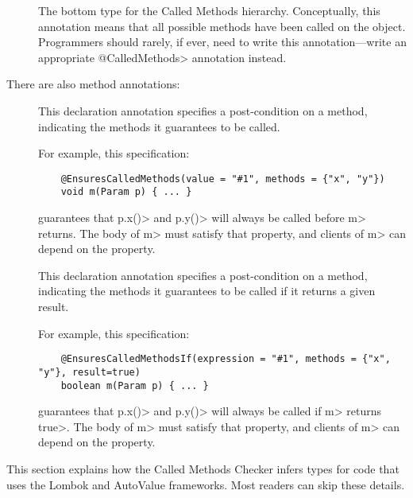 \begin{description}
\item[]
  The bottom type for the Called Methods hierarchy. Conceptually, this annotation
  means that all possible methods have been called on the object. Programmers should rarely,
  if ever, need to write this annotation---write an appropriate \<@CalledMethods> annotation
  instead.

\end{description}

There are also method annotations:

\begin{description}
\item[]
  This declaration annotation specifies a post-condition on a method, indicating the methods it
  guarantees to be called.

  For example, this specification:

  \begin{Verbatim}
    @EnsuresCalledMethods(value = "#1", methods = {"x", "y"})
    void m(Param p) { ... }
  \end{Verbatim}

  guarantees that \<p.x()> and \<p.y()> will always be called before \<m> returns.
  The body of \<m> must satisfy that property, and clients of \<m> can depend on the property.

\item[]
  This declaration annotation specifies a post-condition on a method, indicating the methods it
  guarantees to be called if it returns a given result.

  For example, this specification:

  \begin{Verbatim}
    @EnsuresCalledMethodsIf(expression = "#1", methods = {"x", "y"}, result=true)
    boolean m(Param p) { ... }
  \end{Verbatim}

  guarantees that \<p.x()> and \<p.y()> will always be called if \<m> returns \<true>.
  The body of \<m> must satisfy that property, and clients of \<m> can depend on the property.
\end{description}


This section explains how the Called Methods Checker infers types for code
that uses the Lombok and AutoValue frameworks. Most readers can skip these
details.


